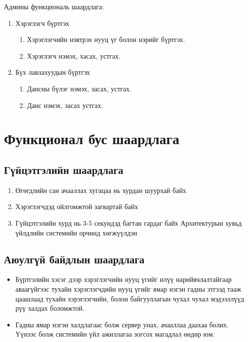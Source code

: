 Админы функциональ шаардлага:
\begin{enumerate}
	\item Хэрэглэгч бүртгэх
	\begin{enumerate}
		\item[1.1] Хэрэглэгчийн нэвтрэх нууц үг болон нэрийг бүртгэх.
		\item[1.2] Хэрэглэгч нэмэх, хасах, устгах.
	\end{enumerate}
	\item Бүх лавлахуудын бүртгэх
	\begin{enumerate}
		\item[2.1] Дансны бүлэг нэмэх, засах, устгах.
		\item[2.2] Данс нэмэх, засах устгах.

	\end{enumerate}
\end{enumerate}

\section{Функционал бус шаардлага}
\subsection{Гүйцэтгэлийн шаардлага}
\begin{enumerate}
	\item Өгөгдлийн сан ачааллах хугацаа нь хурдан шуурхай байх
	\item Хэрэглэгчдэд ойлгомжтой загвартай байх 
	\item Гүйцэтгэлийн хурд нь 3-5 секундэд багтан гардаг байх 
	Архитектурын хувьд үйлдлийн системийн орчинд хөгжүүлдэн
	
\end{enumerate}
\subsection{Аюулгүй байдлын шаардлага}
\begin{itemize}
	\item Бүртгэлийн хэсэг дээр хэрэглэгчийн нууц үгийг илүү нарийвчлалтайгаар аваагүйгээс тухайн хэрэглэгчдийн нууц үгийг ямар нэгэн гадны этгээд тааж цаашлаад тухайн хэрэглэгчийн, болон байгууллагын чухал чухал мэдээллүүд рүү халдах боломжтой. 
	\item Гадны ямар нэгэн халдлагаас болж сервер унах, ачааллаа даахаа болих. Үүнээс болж системийн үйл ажиллагаа зогсох магадлал өндөр юм.
\end{itemize}
